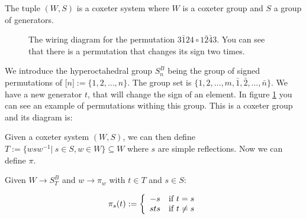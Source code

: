 \begin{definition}
  The tuple $(W,S)$ is a coxeter system where $W$ is a coxeter group and $S$ a group of generators.
\end{definition}

\begin{figure}
  \begin {center}
  \caption{The wiring diagram for the permutation  $3\bar{1}24 \circ 1\bar{2}\bar{4}3$. You can see that there is a permutation that changes its sign two times.}
  \end{center}
\label{fig:wiring_snB}
\end{figure}

We introduce the hyperoctahedral group $S_n^B$ being the group of signed permutations of $\big[n\big] := \{1, 2, \dots, n\}$. The group set is $\{1,2,\dots,m,\bar{1}, \bar{2},\dots, \bar{n}\}$. We have a new generator $t$, that will change the sign of an element. In figure \ref{fig:wiring_snB} you can see an example of permutations withing this group. This is a coxeter group and its diagram is:

\begin{center}
\end{center}

Given a coxeter system $(W,S)$, we can then define $T := \{wsw^{-1} |\ s\in S, w \in W\} \subseteq W$ where $s$ are simple reflections. Now we can define $\pi$.

\begin{definition}
  Given $W \to S_T^B$ and $w \to \pi_w$ with $t\in T$ and $s\in S$:

  \begin{equation}
    \pi_s(t) := \left \{
    \begin{array}{c @{} c}
        -s \quad &\text{if } t = s \\
        sts \quad &\text{if } t \neq s \\
    \end{array}\right.
  \end{equation}
\end{definition}

